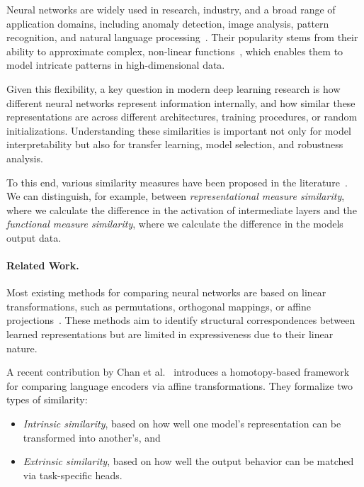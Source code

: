 Neural networks are widely used in research, industry, and a broad range of application domains, including anomaly detection, image analysis, pattern recognition, and natural language processing~\cite{pedrycz_deep_2020}.  
Their popularity stems from their ability to approximate complex, non-linear functions~\cite{antiga_deep_2020}, which enables them to model intricate patterns in high-dimensional data.

Given this flexibility, a key question in modern deep learning research is how different neural networks represent information internally, and how similar these representations are across different architectures, training procedures, or random initializations.  
Understanding these similarities is important not only for model interpretability but also for transfer learning, model selection, and robustness analysis.

To this end, various similarity measures have been proposed in the literature~\cite{klabunde_similarity_2024}.
We can distinguish, for example, between \textit{representational measure similarity}, where we calculate the difference in the activation of intermediate layers and the \textit{functional measure similarity}, where we calculate the difference in the models output data. 

\paragraph{Related Work.}
Most existing methods for comparing neural networks are based on linear transformations, such as permutations, orthogonal mappings, or affine projections~\cite{kornblith_similarity_2019, williams_generalized_2021, li_convergent_2016}.  
These methods aim to identify structural correspondences between learned representations but are limited in expressiveness due to their linear nature.

A recent contribution by Chan et al.~\cite{chan_affine_2024} introduces a homotopy-based framework for comparing language encoders via affine transformations.  
They formalize two types of similarity:
\begin{itemize}
    \item \textit{Intrinsic similarity}, based on how well one model’s representation can be transformed into another’s, and
    \item \textit{Extrinsic similarity}, based on how well the output behavior can be matched via task-specific heads.
\end{itemize}

